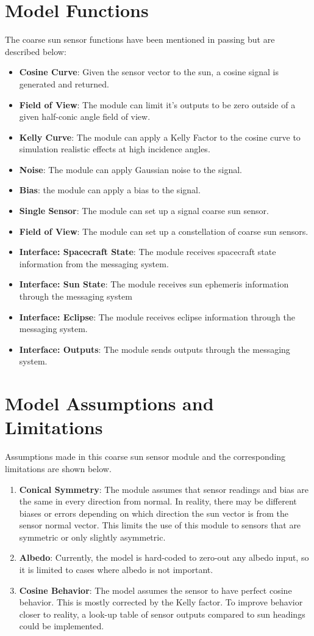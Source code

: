 \section{Model Functions}
The coarse sun sensor functions have been mentioned in passing but are described below:
\begin{itemize}
	\item \textbf{Cosine Curve}: Given the sensor vector to the sun, a cosine signal is generated and returned.
	\item \textbf{Field of View}: The module can limit it's outputs to be zero outside of a given half-conic angle field of view.
	\item \textbf{Kelly Curve}: The module can apply a Kelly Factor to the cosine curve to simulation realistic effects at high incidence angles.
	\item \textbf{Noise}: The module can apply Gaussian noise to the signal.
	\item \textbf{Bias}: the module can apply a bias to the signal.
	\item \textbf{Single Sensor}: The module can set up a signal coarse sun sensor.
	\item \textbf{Field of View}: The module can set up a constellation of coarse sun sensors.
	\item \textbf{Interface: Spacecraft State}: The module receives spacecraft state information from the messaging system.
	\item \textbf{Interface: Sun State}: The module receives sun ephemeris information through the messaging system
	\item \textbf{Interface: Eclipse}: The module receives eclipse information through the messaging system.
	\item \textbf{Interface: Outputs}: The module sends outputs through the messaging system.
\end{itemize}

\section{Model Assumptions and Limitations}
Assumptions made in this coarse sun sensor module and the corresponding limitations are shown below.
\begin{enumerate}
	\item \textbf{Conical Symmetry}: The module assumes that sensor readings and bias are the same in every direction from normal. In reality, there may be different biases or errors depending on which direction the sun vector is from the sensor normal vector. This limits the use of this module to sensors that are symmetric or only slightly asymmetric.
	\item \textbf{Albedo}: Currently, the model is hard-coded to zero-out any albedo input, so it is limited to cases where albedo is not important.
	\item \textbf{Cosine Behavior}: The model assumes the sensor to have perfect cosine behavior. This is mostly corrected by the Kelly factor. To improve behavior closer to reality, a look-up table of sensor outputs compared to sun headings could be implemented.
\end{enumerate}